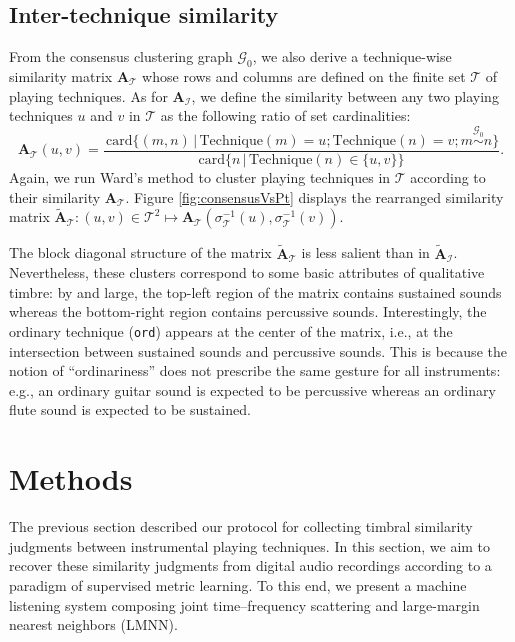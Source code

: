 \documentclass{bmcart}
\makeatletter
\newcommand*{\eg}{e.g.,\@\xspace}
\newcommand*{\ie}{i.e.,\@\xspace}
\newcommand{\Card}{\mathrm{card}}
\newcommand{\ml}[1]{\textcolor{blue}{ML: #1}\xspace}
\newcommand{\vl}[1]{\textcolor{red}{VL: #1}\xspace}
\newcommand{\nmu}{}
\makeatother
\begin{document}
\subsection*{Inter-technique similarity}
From the consensus clustering graph $\mathcal{G}_0$, we also derive a technique-wise similarity matrix $\mathbf{A}_{\mathcal{T}}$ whose rows and columns are defined on the finite set $\mathcal{T}$ of playing techniques.
As for $\mathbf{A}_{\mathcal{I}}$, we define the similarity between any two playing techniques $u$ and $v$ in $\mathcal{T}$ as the following ratio of set cardinalities:
\begin{equation}
\mathbf{A}_{\mathcal{T}}(u,v) = \dfrac{
\,\Card \big\{ (m, n) \,\vert\, \mathrm{Technique}(m)=u ; \mathrm{Technique}(n)=v ; m \overset{\mathcal{G}_0}{\sim} n \big\}
}{
\Card \big\{n \,\vert\, \mathrm{Technique}(n) \in \{ u, v \} \big\}
}.
\label{eq:technique-similarity}
\end{equation}
Again, we run Ward's method to cluster playing techniques in $\mathcal{T}$ according to their similarity $\mathbf{A}_{\mathcal{T}}$.
Figure \ref{fig:consensusVsPt} displays the rearranged similarity matrix $\widetilde{\mathbf{A}}_{\mathcal{T}} : (u,v)\in \mathcal{T}^2 \mapsto \mathbf{A}_{\mathcal{T}}(\sigma_{\mathcal{T}}^{-1}(u), \sigma_{\mathcal{T}}^{-1}(v))$.

The block diagonal structure of the matrix $\widetilde{\mathbf{A}}_{\mathcal{T}}$ is less salient than in $\widetilde{\mathbf{A}}_{\mathcal{I}}$.
Nevertheless, these clusters correspond to some basic attributes of qualitative timbre: by and large, the top-left region of the matrix contains sustained sounds whereas the bottom-right region contains percussive sounds.
Interestingly, the ordinary technique (\texttt{ord}) appears at the center of the matrix, \ie{} at the intersection between sustained sounds and percussive sounds.
This is because the notion of ``ordinariness'' does not prescribe the same gesture for all instruments: \eg{} an ordinary guitar sound is expected to be percussive whereas an ordinary flute sound is expected to be sustained.

\section*{\nmu Methods}
\label{sec:methods}
The previous section described our protocol for collecting timbral similarity judgments between instrumental playing techniques.
In this section, we aim to recover these similarity judgments from digital audio recordings according to a paradigm of supervised metric learning.
To this end, we present a machine listening system composing joint time--frequency scattering and large-margin nearest neighbors (LMNN).
\end{document}
